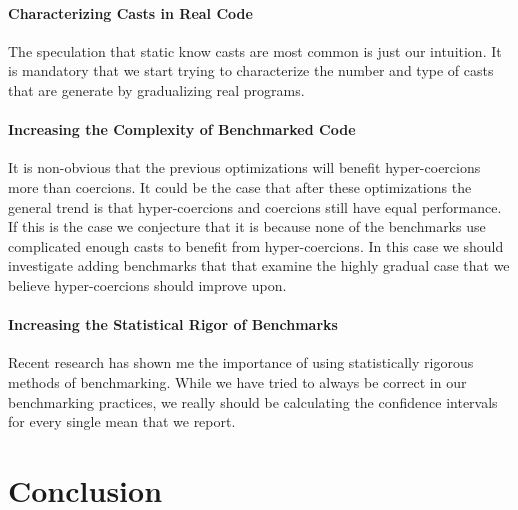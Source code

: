 \documentclass[acmtog, authorversion, acmlarge]{acmart}
\begin{document}
\paragraph{Characterizing Casts in Real Code}
The speculation that static know casts are most
common is just our intuition. It is mandatory
that we start trying to characterize the
number and type of casts that are generate
by gradualizing real programs. 

\paragraph{Increasing the Complexity of Benchmarked Code}
It is non-obvious that the previous optimizations
will benefit hyper-coercions more than coercions.
It could be the case that after these optimizations
the general trend is that hyper-coercions and coercions
still have equal performance. If this is the case we conjecture
that it is because none of the benchmarks use
complicated enough casts to benefit from hyper-coercions.
In this case we should investigate adding benchmarks that
that examine the highly gradual case that we believe hyper-coercions
should improve upon.

\paragraph{Increasing the Statistical Rigor of Benchmarks}
Recent research has shown me the importance of using
statistically rigorous methods of benchmarking.
While we have tried to always be correct in our benchmarking
practices, we really should be calculating the confidence
intervals for every single mean that we report. 


\section{Conclusion}



\end{document}
